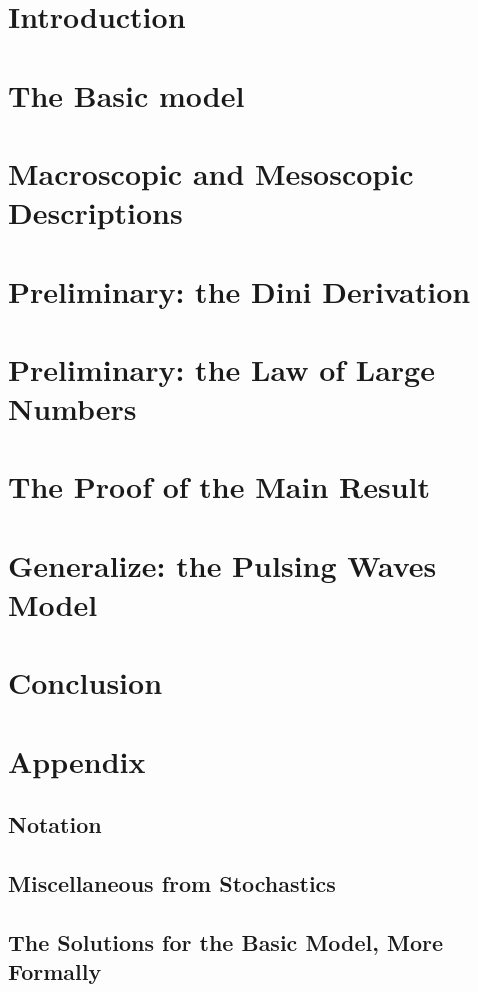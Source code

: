 \documentclass[11pt, a4paper]{scrreprt}
\begin{document}
\tableofcontents


\chapter{Introduction}


\chapter{The Basic model}


\chapter{Macroscopic and Mesoscopic Descriptions}


\chapter{Preliminary: the Dini Derivation}


\chapter{Preliminary: the Law of Large Numbers}


\chapter{The Proof of the Main Result}


\chapter{Generalize: the Pulsing Waves Model}


\chapter{Conclusion}

%

\printbibliography[heading=bibintoc]

\appendix
\chapter{Appendix}

	\section{Notation}
	
	
	\section{Miscellaneous from Stochastics}
	
	
	\section{The Solutions for the Basic Model, More Formally}
	
\end{document}
